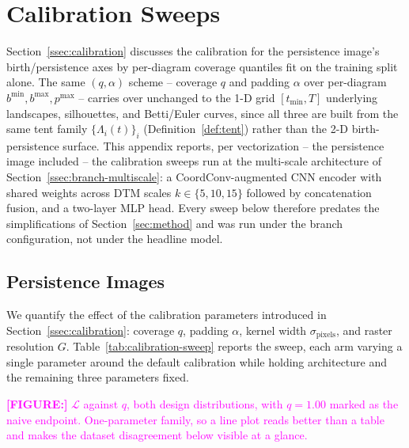 \documentclass[11pt,letterpaper]{article}
\newcommand{\1}{\mathds{1}}
\newcommand{\fig}[1]{\textcolor{magenta}{\textbf{[FIGURE:] }#1}}
\theoremstyle{plain}
\theoremstyle{definitioncolon}
\begin{document}
\section{Calibration Sweeps}
\label{app:calibration-sweeps}

\label{app:alt-calibration}%

Section~\ref{ssec:calibration} discusses the calibration for the persistence image's birth/persistence
axes by per-diagram coverage quantiles fit on the training split alone. The same
$(q, \alpha)$ scheme -- coverage $q$ and padding $\alpha$ over per-diagram
$b^{\min}, b^{\max}, p^{\max}$ -- carries over unchanged to the 1-D grid
$[t_{\min}, T]$ underlying landscapes, silhouettes, and Betti/Euler curves, since
all three are built from the same tent family $\{\Lambda_i(t)\}_i$
(Definition~\ref{def:tent}) rather than the 2-D birth-persistence surface. This
appendix reports, per vectorization -- the persistence image included -- the
calibration sweeps run at the multi-scale architecture of
Section~\ref{ssec:branch-multiscale}: a CoordConv-augmented
CNN encoder with shared weights across DTM scales $k \in \{5,10,15\}$ followed
by concatenation fusion, and a
two-layer MLP head. Every sweep below therefore predates the simplifications of
Section~\ref{sec:method} and was run under the branch configuration, not under
the headline model.

\subsection{Persistence Images}
\label{app:calib-pi}

We quantify the effect
of the calibration parameters introduced in Section~\ref{ssec:calibration}:
coverage $q$, padding $\alpha$, kernel width $\sigma_{\text{pixels}}$, and
raster resolution $G$. Table~\ref{tab:calibration-sweep} reports the
sweep, each arm varying a single parameter around the default
calibration while holding architecture and the remaining three parameters
fixed.

\fig{$\mathcal{L}$ against $q$, both design distributions, with $q=1.00$ marked
as the naive endpoint. One-parameter family, so a line plot reads better than a
table and makes the dataset disagreement below visible at a glance.}
\end{document}
